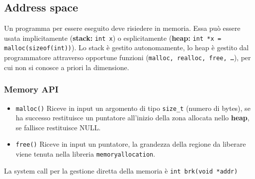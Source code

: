 \documentclass[12pt, letterpaper]{article}
\begin{document}
		
		\subsection{Address space}
			Un programma per essere eseguito deve risiedere in memoria. Essa può essere usata implicitamente (\textbf{stack:} \texttt{int x}) o esplicitamente (\textbf{heap:} \texttt{int *x = malloc(sizeof(int))}). Lo stack è gestito autonomamente, lo heap è gestito dal programmatore attraverso opportune funzioni (\texttt{malloc, realloc, free, \dots}), per cui non si conosce a priori la dimensione.
			
			\subsubsection{Memory API}
				\begin{itemize}
					\item \texttt{malloc()} Riceve in input un argomento di tipo \texttt{size\_t} (numero di bytes), se ha successo restituisce un puntatore all'inizio della zona allocata nello \textbf{heap}, se fallisce restituisce NULL.
					\item \texttt{free()} Riceve in input un puntatore, la grandezza della regione da liberare viene tenuta nella libreria \texttt{memoryallocation}.
				\end{itemize}
				
				La system call per la gestione diretta della memoria è \texttt{int brk(void *addr)}
				
\end{document}

